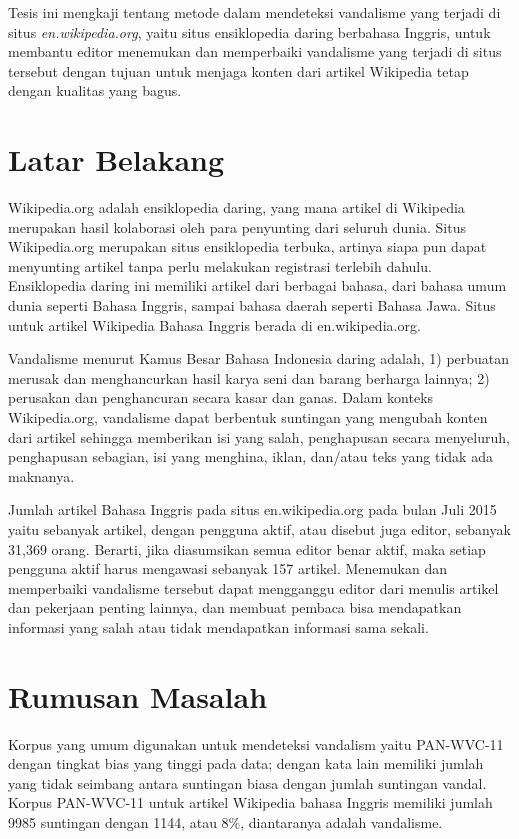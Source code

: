 \documentclass[12pt,a4paper,titlepage]{article}
\begin{document}
Tesis ini mengkaji tentang metode dalam mendeteksi vandalisme yang terjadi di situs \textit{en.wikipedia.org}, yaitu situs ensiklopedia daring berbahasa Inggris, untuk membantu editor menemukan dan memperbaiki vandalisme yang terjadi di situs tersebut dengan tujuan untuk menjaga konten dari artikel Wikipedia tetap dengan kualitas yang bagus.

\section{Latar Belakang}\label{sec:latar-belakang}

Wikipedia.org adalah ensiklopedia daring, yang mana artikel di Wikipedia merupakan hasil kolaborasi oleh para penyunting dari seluruh dunia.
Situs Wikipedia.org merupakan situs ensiklopedia terbuka, artinya siapa pun dapat menyunting artikel tanpa perlu melakukan registrasi terlebih dahulu.
Ensiklopedia daring ini memiliki artikel dari berbagai bahasa, dari bahasa umum dunia seperti Bahasa Inggris, sampai bahasa daerah seperti Bahasa Jawa.
Situs untuk artikel Wikipedia Bahasa Inggris berada di en.wikipedia.org.

Vandalisme menurut Kamus Besar Bahasa Indonesia daring adalah, 1) perbuatan merusak dan menghancurkan hasil karya seni dan barang berharga lainnya; 2) perusakan dan penghancuran secara kasar dan ganas.
Dalam konteks Wikipedia.org, vandalisme dapat berbentuk suntingan yang mengubah konten dari artikel sehingga memberikan isi yang salah, penghapusan secara menyeluruh, penghapusan sebagian, isi yang menghina, iklan, dan/atau teks yang tidak ada maknanya.

Jumlah artikel Bahasa Inggris pada situs en.wikipedia.org pada bulan Juli 2015 yaitu sebanyak  artikel, dengan pengguna aktif, atau disebut juga editor, sebanyak 31,369 orang.
Berarti, jika diasumsikan semua editor benar aktif, maka setiap pengguna aktif harus mengawasi sebanyak 157 artikel.
Menemukan dan memperbaiki vandalisme tersebut dapat mengganggu editor dari menulis artikel dan pekerjaan penting lainnya, dan membuat pembaca bisa mendapatkan informasi yang salah atau tidak mendapatkan informasi sama sekali.

\section{Rumusan Masalah}\label{sec:rumusan-masalah}

Korpus yang umum digunakan untuk mendeteksi vandalism yaitu PAN-WVC-11 dengan tingkat bias yang tinggi pada data; dengan kata lain memiliki jumlah yang tidak seimbang antara suntingan biasa dengan jumlah suntingan vandal.
Korpus PAN-WVC-11 untuk artikel Wikipedia bahasa Inggris memiliki jumlah 9985 suntingan dengan 1144, atau 8\%, diantaranya adalah vandalisme.
\end{document}
